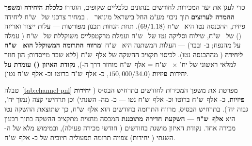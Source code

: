 כדי לעגן את יעד המכירות לחודשים  בנתונים כלכליים שקופים, הוגדרו
\textbf{כלכלת היחידה} ו\textbf{משפך ההמרה לערוצים} תוך ניכוי  מע"מ
החל בישראל מינואר ~\cite{pwc2025israelvat}. במחיר צרכני של
~ש"ח ליחידה פיזית, ההכנסה נטו היא ~ש"ח ($69/1.18$). תחת
הנחות תכנון מפורשות --- עלות ייצור ואריזה () של ~ש"ח, שילוח
וסליקה נטו של ~ש"ח ועמלת מרקטפלייס משוקללת של ~ש"ח (
עמלה על  מהנפח;  ב- ובבר) --- העלות המשתנה היא
~ש"ח ו\textbf{מרווח התרומה המשוקלל הוא ~ש"ח ליחידה}
( מההכנסה נטו). לכיסוי תקציב ההשקה של  אלף~ש"ח (ללא שכר
מייסדות; הון חוזר למלאי ראשוני של  יח' $\times$ ~ש"ח =
 אלף~ש"ח מוחזר דרך ה-), \textbf{נקודת האיזון ()
עומדת על  יחידות פיזיות} ($150{,}000/34.0$, כ- אלף~ש"ח
ברוטו וכ- אלף~ש"ח נטו).

טבלה~\ref{tab:channel-pnl} מפרטת את משפך המכירות לחודשים  בתרחיש
הבסיס (\textbf{ יחידות פיזיות}, כ- אלף~ש"ח ברוטו
וכ- אלף~ש"ח נטו --- כ- מה- השנתי) וכן תרחישי
קצה (נמוך  יח', גבוה  יח'). בתרחיש הבסיס, מרווח התרומה
בחודשים  הוא  אלף~ש"ח, כך שתוצאת ההשקה נטו היא
\textbf{ אלף~ש"ח} --- \textbf{השקעת חדירה מתוכננת} המכסה מחצית
מתקציב ההשקה בתוך רבעון מכירה אחד. נקודת האיזון מושגת בחודשים 
( חודשי מכירה פעילה), ובמימוש מלא של ה- השנתי (
יחידות) צפויה תרומה תפעולית חיובית של כ- אלף~ש"ח.

